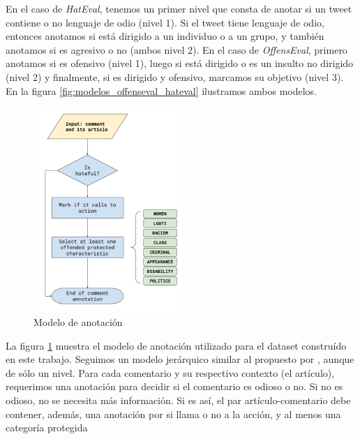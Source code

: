 En el caso de \emph{HatEval}, tenemos un primer nivel que consta de anotar si un tweet contiene o no lenguaje de odio (nivel 1). Si el tweet tiene lenguaje de odio, entonces anotamos si está dirigido a un individuo o a un grupo, y también anotamos si es agresivo o no (ambos nivel 2). En el caso de \emph{OffensEval}, primero anotamos si es ofensivo (nivel 1), luego si está dirigido o es un insulto no dirigido (nivel 2) y finalmente, si es dirigido y ofensivo, marcamos su objetivo (nivel 3). En la figura \ref{fig:modelos_offenseval_hateval} ilustramos ambos modelos.


%
%
%



\begin{figure}
    \centering
    \includegraphics[width=0.5\textwidth]{img/Annotation Model.png}
    \caption{Modelo de anotación}
    \label{fig:annotation_model}
\end{figure}


La figura \ref{fig:annotation_model} muestra el modelo de anotación utilizado para el dataset construído en este trabajo. Seguimos un modelo jerárquico similar al propuesto por \citet{zampieri2019predicting}, aunque de sólo un nivel. Para cada comentario y su respectivo contexto (el artículo), requerimos una anotación  para decidir si el comentario es odioso o no. Si no es odioso, no se necesita más información. Si es así, el par artículo-comentario debe contener, además, una anotación por si llama o no a la acción, y al menos una categoría protegida





